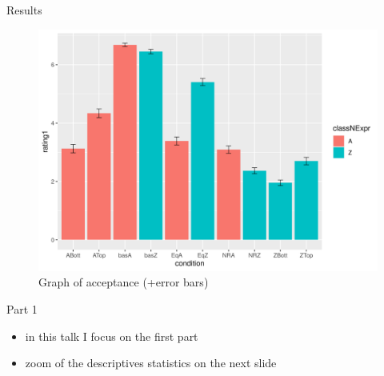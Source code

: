 \documentclass[
  ignorenonframetext,
]{beamer}
\providecommand{\tightlist}{%
  \setlength{\itemsep}{0pt}\setlength{\parskip}{0pt}}\usepackage{longtable,booktabs,array}
\begin{document}
\begin{frame}
\begin{block}{Results}
\protect\hypertarget{results}{}
\begin{figure}

{\centering \includegraphics{"error_bar.png"}

}

\caption{Graph of acceptance (+error bars)}

\end{figure}
\end{block}
\end{frame}

\begin{frame}
\begin{block}{Part 1}
\protect\hypertarget{part-1}{}
\begin{itemize}
\tightlist
\item
  in this talk I focus on the first part
\item
  zoom of the descriptives statistics on the next slide
\end{itemize}
\end{block}
\end{frame}
\end{document}
